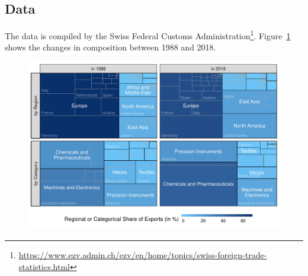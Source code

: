 \clearpage

\subsection{Data}\label{sec:data}

The data is compiled by the Swiss Federal Customs Administration\footnote{\url{https://www.ezv.admin.ch/ezv/en/home/topics/swiss-foreign-trade-statistics.html}}.  Figure~\ref{fig:treemap} shows the changes in composition between 1988 and 2018.

\begin{figure}[H]
	\includegraphics[width=\textwidth]{fig/fig_treemap}
	\label{fig:treemap}
\end{figure}


